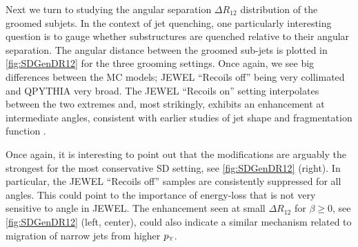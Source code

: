 Next we turn to studying the angular separation $\Delta R_{12}$ distribution of the groomed subjets. In the context of jet quenching, one particularly interesting question is to gauge whether substructures are quenched relative to their angular separation. The angular distance between the groomed sub-jets is plotted in \autoref{fig:SDGenDR12} for the three grooming settings. Once again, we see big differences between the MC models; JEWEL ``Recoils off'' being very collimated and QPYTHIA very broad. 
The JEWEL ``Recoils on'' setting interpolates between the two extremes and, most strikingly, exhibits an enhancement at intermediate angles, consistent with earlier studies of jet shape and fragmentation function \cite{KunnawalkamElayavalli:2017hxo}.

Once again, it is interesting to point out that the modifications are arguably the strongest for the most conservative SD setting, see \autoref{fig:SDGenDR12} (right). In particular, the JEWEL ``Recoils off'' samples are consistently suppressed for all angles. This could point to the importance of energy-loss that is not very sensitive to angle in JEWEL. The enhancement seen at small $\Delta R_{12}$ for $\beta \geq 0$, see \autoref{fig:SDGenDR12} (left, center), could also indicate a similar mechanism related to migration of narrow jets from higher $p_{\text{\tiny T}}$.


